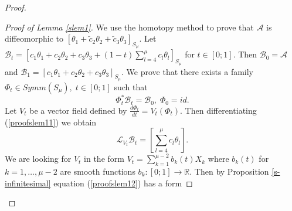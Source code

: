 \documentclass{amsart}
\theoremstyle{definition}
\numberwithin{equation}{section}
\begin{document}
\begin{proof}
\begin{proof}[Proof of Lemma \ref{slem1}]

We use the homotopy method to prove that  $\mathcal{A}$ is diffeomorphic to $[\theta_1+ \widetilde{c}_2\theta_2+\widetilde{c}_3 \theta_3]_{S_{\mu}}$.
Let $\mathcal{B}_t=[c_1 \theta_1+c_2 \theta_2+c_3 \theta_3+(1-t)\sum_{l=4}^{\mu}c_l \theta_l]_{S_{\mu}}$
\; for $t \in[0;1]$. Then $\mathcal{B}_0=\mathcal{A}$\; and \;$\mathcal{B}_1=[c_1 \theta_1+c_2 \theta_2+c_3 \theta_3]_{S_{\mu}}$.
 We prove that there exists a family $\Phi_t \in Symm(S_{\mu}),\;t\in [0;1]$ such that
 \begin{equation}
\label{proofslem11}   \Phi_t^*\mathcal{B}_t=\mathcal{B}_0,\;\Phi_0=id.
\end{equation}
Let $V_t$ be a vector field defined by $\frac{d \Phi_t}{dt}=V_t(\Phi_t)$. Then differentiating (\ref{proofslem11}) we obtain
  \begin{equation}
\label{proofslem12}   \mathcal L_{V_t} \mathcal{B}_t=[\sum_{l=4}^{\mu}c_l \theta_l].
\end{equation}
We are looking for $V_t$ in the form $V_t=\sum_{k=1}^{\mu-2}b_k(t) X_k$   where $b_k(t)$ for $k=1,\ldots,\mu-2$ are smooth functions $b_k:[0;1]\rightarrow \mathbb{R}$. Then by Proposition  \ref{s-infinitesimal} equation
(\ref{proofslem12}) has a form


\end{proof}
\end{proof}
\end{document}
